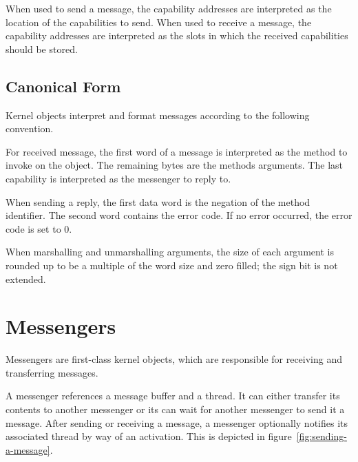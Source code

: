 When used to send a message, the capability addresses are interpreted
as the location of the capabilities to send.  When used to receive a
message, the capability addresses are interpreted as the slots in
which the received capabilities should be stored.

\subsection{Canonical Form}

Kernel objects interpret and format messages according to the
following convention.

For received message, the first word of a message is interpreted as
the method to invoke on the object.  The remaining bytes are the
methods arguments.  The last capability is interpreted as the
messenger to reply to.

When sending a reply, the first data word is the negation of the
method identifier.  The second word contains the error code.  If no
error occurred, the error code is set to 0.

When marshalling and unmarshalling arguments, the size of each
argument is rounded up to be a multiple of the word size and zero
filled; the sign bit is not extended.

\section{Messengers}

Messengers are first-class kernel objects, which are responsible for
receiving and transferring messages.

A messenger references a message buffer and a thread.  It can either
transfer its contents to another messenger or its can wait for another
messenger to send it a message.  After sending or receiving a message,
a messenger optionally notifies its associated thread by way of an
activation.  This is depicted in figure~\ref{fig:sending-a-message}.

